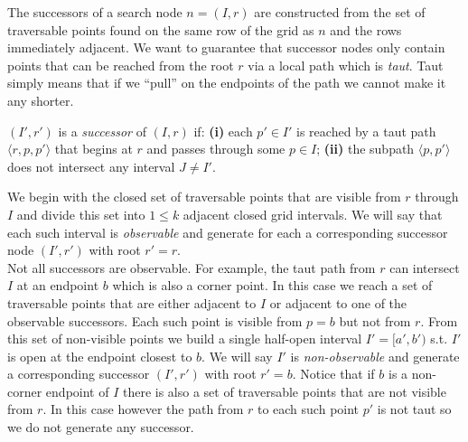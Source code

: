 The successors of a search node $n = (I, r)$ are  constructed from the 
set of traversable points found on the same row of the grid as $n$ and 
the rows immediately adjacent. 
We want to guarantee that successor nodes only contain points that
can be reached from the root $r$ via a local path which is \emph{taut}.
Taut simply means that if we ``pull'' on the endpoints of 
the path we cannot make it any shorter.

\begin{defi}
$(I', r')$ is a \emph{successor} of
$(I, r)$ if: \textbf{(i)} each $p' \in I'$ is reached
by a taut path $\langle r, p,  p' \rangle$ that begins
at $r$ and passes through some $p \in I$;
\textbf{(ii)} the subpath $\langle p, p' \rangle$ does not intersect any 
interval $J \neq I'$.
\end{defi}
We begin with the closed set of traversable points that are 
visible from $r$ through $I$ and divide this set into $1 \leq k$
adjacent closed grid intervals.
We will say that each such interval is \emph{observable} and 
generate for each a corresponding successor node 
$(I', r')$ with root $r' = r$.
\\
Not all successors are observable.
For example, the taut path from $r$ can intersect 
$I$ at an endpoint $b$ which is also a corner point.
In this case we reach a set of traversable points that 
are either adjacent to $I$ or adjacent to one of the
observable successors.
Each such point is visible from $p = b$ but not 
from $r$.  From this set of non-visible points we build a 
single half-open interval $I' = [a', b')$ s.t. $I'$ is open at the 
endpoint closest to $b$.
We will say $I'$ is \emph{non-observable} and generate a 
corresponding successor $(I', r')$ with root $r' = b$.  
Notice that if $b$ is a non-corner endpoint of $I$ there 
is also a set of traversable points that are not visible from $r$.
In this case however the path from $r$ to each such point $p'$ is 
not taut so we do not generate any successor.

%


